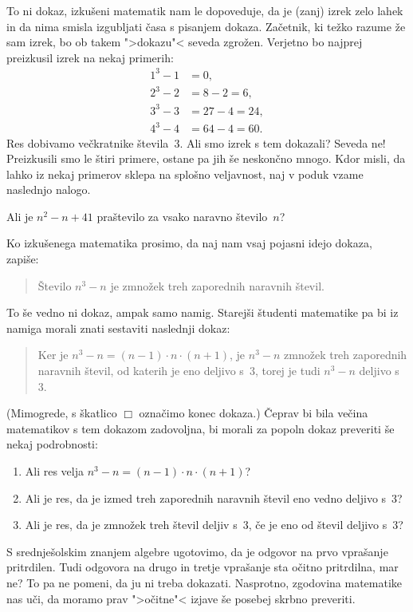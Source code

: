 \noindent
To ni dokaz, izkušeni matematik nam le dopoveduje, da je (zanj) izrek
zelo lahek in da nima smisla izgubljati časa s pisanjem dokaza.
Začetnik, ki težko razume že sam izrek, bo ob takem ">dokazu"< seveda
zgrožen. Verjetno bo najprej preizkusil izrek na nekaj primerih:
%
\begin{align*}
  1^3 - 1 &= 0,\\
  2^3 - 2 &= 8 - 2 = 6,\\
  3^3 - 3 &= 27 - 4 = 24,\\
  4^3 - 4 &= 64 - 4 = 60.
\end{align*}
%
Res dobivamo večkratnike števila~$3$. Ali smo izrek s tem dokazali? Seveda ne!
Preizkusili smo le štiri primere, ostane pa jih še neskončno mnogo. Kdor
misli, da lahko iz nekaj primerov sklepa na splošno veljavnost, naj v poduk
vzame naslednjo nalogo.

\begin{vaja}
  Ali je $n^2 - n + 41$ praštevilo za vsako naravno število~$n$?
\end{vaja}

\noindent
Ko izkušenega matematika prosimo, da naj nam vsaj pojasni idejo dokaza,
zapiše:

\begin{quote}
  \begin{dokaz}
    Število $n^3 - n$ je zmnožek treh zaporednih naravnih števil.
  \end{dokaz}
\end{quote}

\noindent
To še vedno ni dokaz, ampak samo namig. Starejši študenti matematike pa
bi iz namiga morali znati sestaviti naslednji dokaz:

\begin{quote}
  \begin{dokaz}
    Ker je $n^3 - n = (n-1) \cdot n \cdot (n+1)$, je $n^3 - n$ zmnožek
    treh zaporednih naravnih števil, od katerih je eno deljivo s~$3$,
    torej je tudi $n^3 - n$ deljivo s~$3$.
  \end{dokaz}
\end{quote}

\noindent
(Mimogrede, s škatlico $\Box$ označimo konec dokaza.) Čeprav bi bila
večina matematikov s tem dokazom zadovoljna, bi morali za popoln dokaz
preveriti še nekaj podrobnosti:
%
\begin{enumerate}
\item Ali res velja $n^3 - n = (n-1) \cdot n \cdot (n+1)$?
\item Ali je res, da je izmed treh zaporednih naravnih števil eno
  vedno deljivo s~$3$?
\item Ali je res, da je zmnožek treh števil deljiv s~$3$, če je eno od
  števil deljivo s~$3$?
\end{enumerate}
%
S srednješolskim znanjem algebre ugotovimo, da je odgovor na prvo
vprašanje pritrdilen. Tudi odgovora na drugo in tretje vprašanje sta
očitno pritrdilna, mar ne? To pa ne pomeni, da ju ni treba dokazati.
Nasprotno, zgodovina matematike nas uči, da moramo prav ">očitne"<
izjave še posebej skrbno preveriti.

